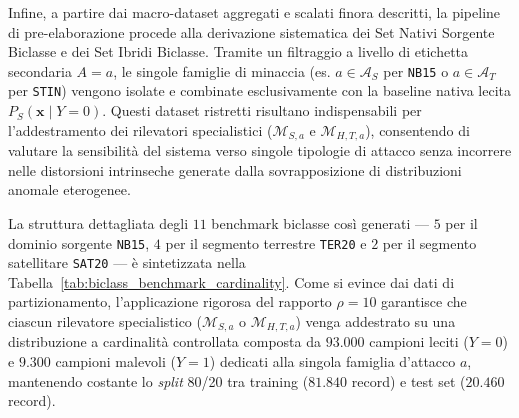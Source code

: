 \begin{table}[H]
    \centering
    \small
    \caption{Riepilogo delle cardinalità finali per i benchmark aggregati.}
    \label{tab:benchmark_cardinality}
\end{table}

Infine, a partire dai macro-dataset aggregati e scalati finora descritti, la pipeline di pre-elaborazione procede alla derivazione sistematica dei Set Nativi Sorgente Biclasse e dei Set Ibridi Biclasse. 
Tramite un filtraggio a livello di etichetta secondaria $A=a$, le singole famiglie di minaccia (es. $a \in \mathcal{A}_S$ per \texttt{NB15} o $a \in \mathcal{A}_T$ per \texttt{STIN}) vengono isolate e combinate esclusivamente con la baseline nativa lecita $P_S(\mathbf{x} \mid Y = 0)$. 
Questi dataset ristretti risultano indispensabili per l'addestramento dei rilevatori specialistici ($\mathcal{M}_{S,a}$ e $\mathcal{M}_{H,T,a}$), consentendo di valutare la sensibilità del sistema verso singole tipologie di attacco senza incorrere nelle distorsioni intrinseche generate dalla sovrapposizione di distribuzioni anomale eterogenee.

La struttura dettagliata degli $11$ benchmark biclasse così generati — $5$ per il dominio sorgente \texttt{NB15}, $4$ per il segmento terrestre \texttt{TER20} e $2$ per il segmento satellitare \texttt{SAT20} — è sintetizzata nella Tabella~\ref{tab:biclass_benchmark_cardinality}. 
Come si evince dai dati di partizionamento, l'applicazione rigorosa del rapporto $\rho = 10$ garantisce che ciascun rilevatore specialistico ($\mathcal{M}_{S,a}$ o $\mathcal{M}_{H,T,a}$) venga addestrato su una distribuzione a cardinalità controllata composta da $93.000$ campioni leciti ($Y=0$) e $9.300$ campioni malevoli ($Y=1$) dedicati alla singola famiglia d'attacco $a$, mantenendo costante lo \textit{split} 80/20 tra training ($81.840$ record) e test set ($20.460$ record).

